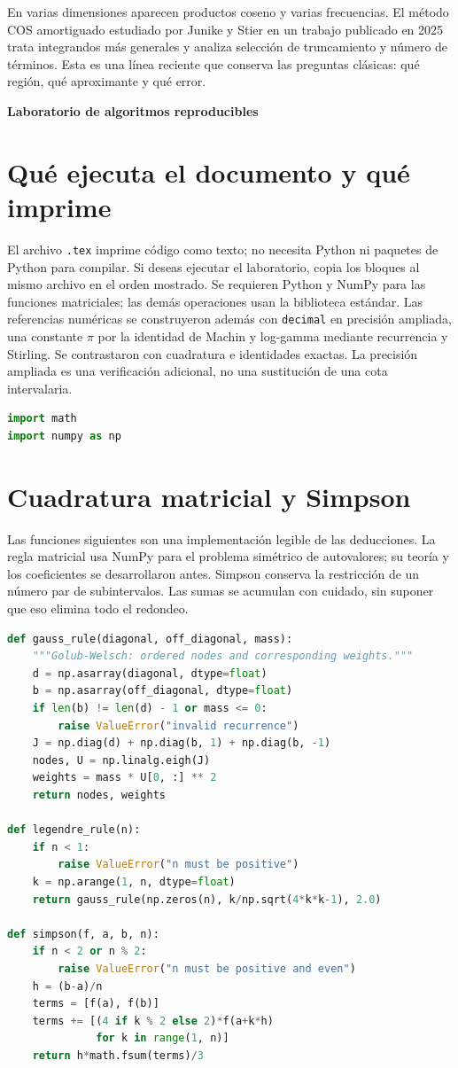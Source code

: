 \documentclass[11pt,a4paper]{article}
\theoremstyle{definition}
\newcommand{\parte}[1]{\par\bigskip\Needspace{8\baselineskip}\begin{center}{\Large\bfseries\color{azul}#1}\end{center}}
\newcounter{problema}
\begin{document}
En varias dimensiones aparecen productos coseno y varias frecuencias. El método COS amortiguado estudiado por Junike y Stier en un trabajo publicado en 2025 trata integrandos más generales y analiza selección de truncamiento y número de términos. Esta es una línea reciente que conserva las preguntas clásicas: qué región, qué aproximante y qué error.



\parte{Laboratorio de algoritmos reproducibles}
\section{Qué ejecuta el documento y qué imprime}
El archivo \texttt{.tex} imprime código como texto; no necesita Python ni paquetes de Python para compilar. Si deseas ejecutar el laboratorio, copia los bloques al mismo archivo en el orden mostrado. Se requieren Python y NumPy para las funciones matriciales; las demás operaciones usan la biblioteca estándar.
Las referencias numéricas se construyeron además con \texttt{decimal} en precisión ampliada, una constante $\pi$ por la identidad de Machin y log-gamma mediante recurrencia y Stirling. Se contrastaron con cuadratura e identidades exactas. La precisión ampliada es una verificación adicional, no una sustitución de una cota intervalaria.

\begin{lstlisting}[language=Python]
import math
import numpy as np
\end{lstlisting}
\section{Cuadratura matricial y Simpson}
Las funciones siguientes son una implementación legible de las deducciones. La regla matricial usa NumPy para el problema simétrico de autovalores; su teoría y los coeficientes se desarrollaron antes. Simpson conserva la restricción de un número par de subintervalos. Las sumas se acumulan con cuidado, sin suponer que eso elimina todo el redondeo.
\begin{lstlisting}[language=Python]
def gauss_rule(diagonal, off_diagonal, mass):
    """Golub-Welsch: ordered nodes and corresponding weights."""
    d = np.asarray(diagonal, dtype=float)
    b = np.asarray(off_diagonal, dtype=float)
    if len(b) != len(d) - 1 or mass <= 0:
        raise ValueError("invalid recurrence")
    J = np.diag(d) + np.diag(b, 1) + np.diag(b, -1)
    nodes, U = np.linalg.eigh(J)
    weights = mass * U[0, :] ** 2
    return nodes, weights

def legendre_rule(n):
    if n < 1:
        raise ValueError("n must be positive")
    k = np.arange(1, n, dtype=float)
    return gauss_rule(np.zeros(n), k/np.sqrt(4*k*k-1), 2.0)

def simpson(f, a, b, n):
    if n < 2 or n % 2:
        raise ValueError("n must be positive and even")
    h = (b-a)/n
    terms = [f(a), f(b)]
    terms += [(4 if k % 2 else 2)*f(a+k*h)
              for k in range(1, n)]
    return h*math.fsum(terms)/3
\end{lstlisting}
\end{document}
